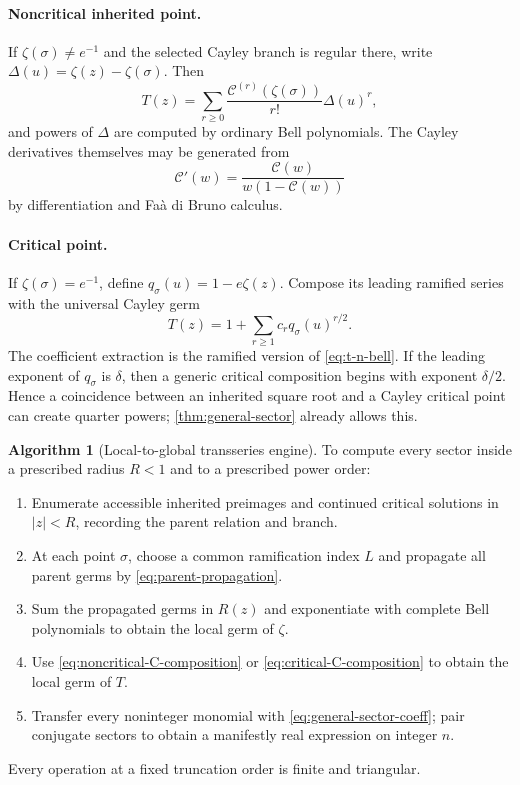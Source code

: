 \documentclass[11pt,oneside]{article}
\numberwithin{equation}{section}
\theoremstyle{plain}
\theoremstyle{definition}
\newtheorem{algorithm}[theorem]{Algorithm}
\theoremstyle{remark}
\newcommand{\Cay}{\mathcal C}
\begin{document}
\paragraph{Noncritical inherited point.}
If $\zeta(\sigma)\ne e^{-1}$ and the selected Cayley branch is regular there,
write $\Delta(u)=\zeta(z)-\zeta(\sigma)$.  Then
\begin{equation}\label{eq:noncritical-C-composition}
 T(z)=\sum_{r\ge0}\frac{\Cay^{(r)}(\zeta(\sigma))}{r!}\Delta(u)^r,
\end{equation}
and powers of $\Delta$ are computed by ordinary Bell polynomials.  The
Cayley derivatives themselves may be generated from
\begin{equation}\label{eq:Cay-derivative}
 \Cay'(w)=\frac{\Cay(w)}{w(1-\Cay(w))}
\end{equation}
by differentiation and Fa\`a di Bruno calculus.

\paragraph{Critical point.}
If $\zeta(\sigma)=e^{-1}$, define $q_\sigma(u)=1-e\zeta(z)$.  Compose its
leading ramified series with the universal Cayley germ
\begin{equation}\label{eq:critical-C-composition}
 T(z)=1+\sum_{r\ge1}c_rq_\sigma(u)^{r/2}.
\end{equation}
The coefficient extraction is the ramified version of
\eqref{eq:t-n-bell}.  If the leading exponent of $q_\sigma$ is $\delta$,
then a generic critical composition begins with exponent $\delta/2$.
Hence a coincidence between an inherited square root and a Cayley critical
point can create quarter powers; \cref{thm:general-sector} already allows
this.

\begin{algorithm}[Local-to-global transseries engine]\label{alg:global-engine}
To compute every sector inside a prescribed radius $R<1$ and to a prescribed
power order:
\begin{enumerate}
\item Enumerate accessible inherited preimages and continued critical
      solutions in $|z|<R$, recording the parent relation and branch.
\item At each point $\sigma$, choose a common ramification index $L$ and
      propagate all parent germs by \eqref{eq:parent-propagation}.
\item Sum the propagated germs in $R(z)$ and exponentiate with complete Bell
      polynomials to obtain the local germ of $\zeta$.
\item Use \eqref{eq:noncritical-C-composition} or
      \eqref{eq:critical-C-composition} to obtain the local germ of $T$.
\item Transfer every noninteger monomial with
      \eqref{eq:general-sector-coeff}; pair conjugate sectors to obtain a
      manifestly real expression on integer $n$.
\end{enumerate}
Every operation at a fixed truncation order is finite and triangular.
\end{algorithm}
\end{document}
